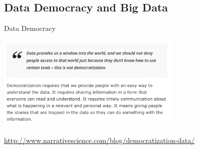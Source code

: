 \documentclass[10pt]{beamer}
\begin{document}
  \subsection{Data Democracy and Big Data}

    \begin{frame}{Data Democracy}
          \begin{center}
             \includegraphics[width=250pt]{../graphs/data_democratization}
          \end{center}
        {\footnotesize \url{http://www.narrativescience.com/blog/democratization-data/}}
    \end{frame}
\end{document}
